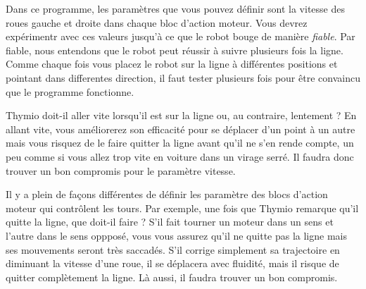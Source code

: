 
Dans ce programme, les paramètres que vous pouvez définir sont la vitesse des roues gauche et droite dans chaque bloc d'action moteur.
Vous devrez expérimentr avec ces valeurs jusqu'à ce que le robot bouge de manière \emph{fiable}.
Par fiable, nous entendons que le robot peut réussir à suivre plusieurs fois la ligne.
Comme chaque fois vous placez le robot sur la ligne à différentes positions et pointant dans differentes direction, il faut tester plusieurs fois pour être convaincu que le programme fonctionne.

Thymio doit-il aller vite lorsqu'il est sur la ligne ou, au contraire, lentement ?
En allant vite, vous améliorerez son efficacité pour se déplacer d'un point à un autre mais vous risquez de le faire quitter la ligne avant qu'il ne s'en rende compte, un peu comme si vous allez trop vite en voiture dans un virage serré.
Il faudra donc trouver un bon compromis pour le paramètre vitesse.

Il y a plein de façons différentes de définir les paramètre des blocs d'action moteur qui contrôlent les tours.
Par exemple, une fois que Thymio remarque qu'il quitte la ligne, que doit-il faire ?
S'il fait tourner un moteur dans un sens et l'autre dans le sens oppposé, vous vous assurez qu'il ne quitte pas la ligne mais ses mouvements seront très saccadés.
S'il corrige simplement sa trajectoire en diminuant la vitesse d'une roue, il se déplacera avec fluidité, mais il risque de quitter complètement la ligne.
Là aussi, il faudra trouver un bon compromis.



